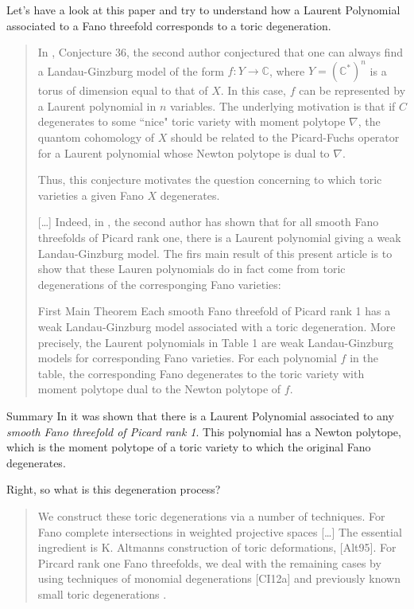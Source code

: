 Let's have a look at this paper and try to understand how a Laurent Polynomial associated to a Fano threefold corresponds to a toric degeneration.

\begin{quotation}
	In \cite{prz09}, Conjecture 36, the second author conjectured that one can always find a Landau-Ginzburg model of the form \(f :Y \to \mathbb{C}\), where \(Y=(\mathbb{C}^*)^n\) is a torus of dimension equal to that of \(X\). In this case, $f$ can be represented by a Laurent polynomial in $n$ variables. The underlying motivation is that if $C$ degenerates to some ``nice" toric variety with moment polytope \(\nabla\), the quantom cohomology of  \(X\) should be related to the Picard-Fuchs operator for a Laurent polynomial whose Newton polytope is dual to \(\nabla\).

	Thus, this conjecture motivates the question concerning to which toric varieties a given Fano \(X\) degenerates.

	[…] Indeed, in \cite{prz09}, the second author has shown that for all smooth Fano threefolds of Picard rank one, there is a Laurent polynomial giving a weak Landau-Ginzburg model. The firs main result of this present article is to show that these Lauren polynomials do in fact come from toric degenerations of the corresponging Fano varieties:

	\begin{thing6}{First Main Theorem}\leavevmode
	Each smooth Fano threefold of Picard rank 1 has a weak Landau-Ginzburg model associated with a toric degeneration. More precisely, the Laurent polynomials in Table 1 are weak Landau-Ginzburg models for corresponding Fano varieties. For each polynomial $f$ in the table, the corresponding Fano degenerates to the toric variety with moment polytope dual to the Newton polytope of $f$.
	\end{thing6}
\end{quotation}

\begin{thing3}{Summary}\leavevmode
In \cite{prz09} it was shown that there is a Laurent Polynomial associated to any \textit{smooth Fano threefold of Picard rank 1}. This polynomial has a Newton polytope, which is the moment polytope of a toric variety to which the original Fano degenerates.
\end{thing3}

Right, so what is this degeneration process?

\begin{quotation}
	We construct these toric degenerations via a number of techniques. For Fano complete intersections in weighted projective spaces […] The essential ingredient is K. Altmanns construction of toric deformations, [Alt95]. For Pircard rank one Fano threefolds, we deal with the remaining cases by using techniques of monomial degenerations [CI12a] and previously known small toric degenerations \cite{galkin1}.
\end{quotation}

